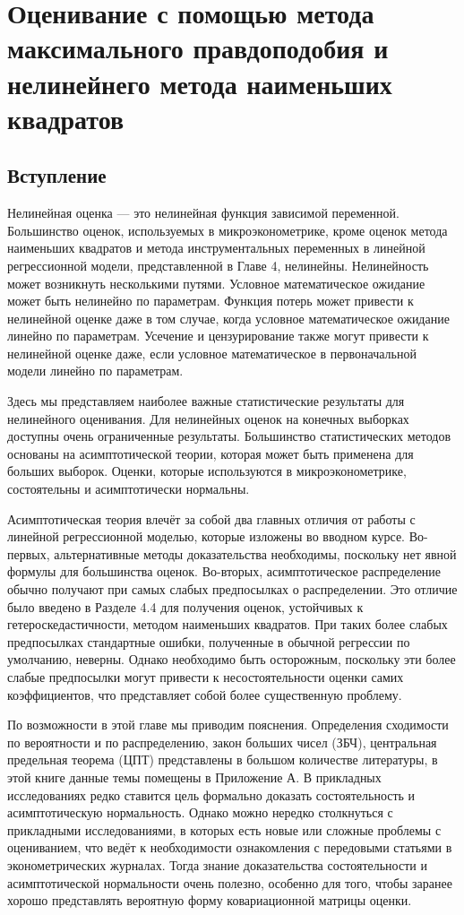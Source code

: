 
\chapter{Оценивание с помощью метода максимального правдоподобия и
нелинейнего метода наименьших квадратов}

\section{Вступление}

Нелинейная оценка --- это нелинейная функция зависимой переменной. Большинство оценок, используемых в микроэконометрике, кроме оценок метода наименьших квадратов и метода инструментальных переменных в линейной регрессионной модели, представленной в Главе 4, нелинейны. Нелинейность может возникнуть несколькими путями. Условное математическое ожидание может быть нелинейно по параметрам. Функция потерь может привести к нелинейной оценке даже в том случае, когда условное математическое ожидание линейно по параметрам. Усечение и цензурирование также могут привести к нелинейной оценке даже, если условное математическое в первоначальной модели линейно по параметрам.

Здесь мы представляем наиболее важные статистические результаты для нелинейного оценивания. Для нелинейных оценок на конечных выборках доступны очень ограниченные результаты. Большинство статистических методов основаны на асимптотической теории, которая может быть применена для больших выборок. Оценки, которые используются в микроэконометрике, состоятельны и асимптотически нормальны. 

Асимптотическая теория влечёт за собой два главных отличия от работы с линейной регрессионной моделью, которые изложены во вводном курсе. Во-первых, альтернативные методы доказательства необходимы, поскольку нет явной формулы для большинства оценок. Во-вторых, асимптотическое распределение обычно получают при самых слабых предпосылках о распределении. Это отличие было введено в Разделе 4.4 для получения оценок, устойчивых к гетероскедастичности, методом наименьших квадратов. При таких более слабых предпосылках стандартные ошибки, полученные в обычной регрессии по умолчанию, неверны. Однако необходимо быть осторожным, поскольку эти более слабые предпосылки могут привести к несостоятельности оценки самих коэффициентов, что представляет собой более существенную проблему.

По возможности в этой главе мы приводим пояснения. Определения сходимости по вероятности и по распределению, закон больших чисел (ЗБЧ), центральная предельная теорема (ЦПТ) представлены в большом количестве литературы, в этой книге данные темы помещены в Приложение А. В прикладных исследованиях редко ставится цель формально доказать состоятельность и асимптотическую нормальность. Однако можно нередко столкнуться с прикладными исследованиями, в которых есть новые или сложные проблемы с оцениванием, что ведёт к необходимости ознакомления с передовыми статьями в эконометрических журналах. Тогда знание доказательства состоятельности и асимптотической нормальности очень полезно, особенно для того, чтобы заранее хорошо представлять вероятную форму ковариационной матрицы оценки.

